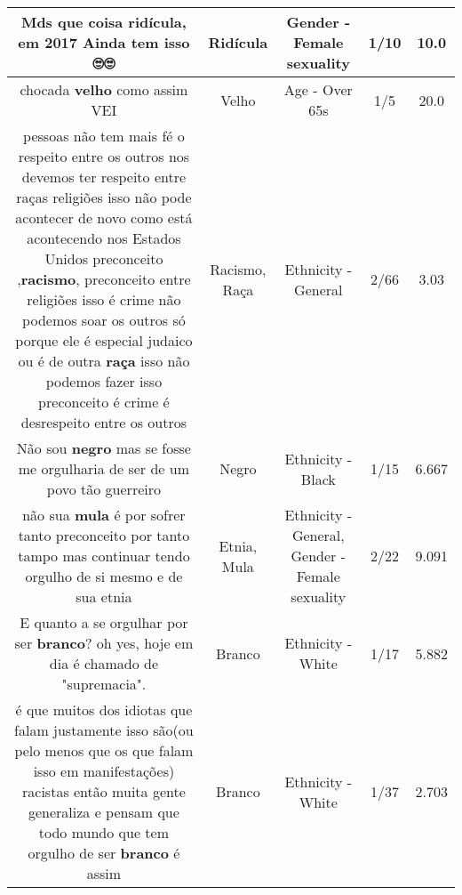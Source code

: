 \documentclass[11pt]{article}
\newlength\mylength
\begin{document}
\begin{center}
\begin{longtable}{|C{.65\mylength}|C{.30\mylength}|C{.12\mylength}|C{.12\mylength}|C{.12\mylength}|}
  \small Mds que coisa \textbf{ridícula}, em 2017 Ainda tem isso 🙄🙄\normalsize   & Ridícula & Gender - Female sexuality & 1/10 & 10.0 \\  \hline
  \small chocada \textbf{velho} como assim VEI\normalsize   & Velho & Age - Over 65s & 1/5 & 20.0 \\  \hline
  \small pessoas não  tem mais fé  o respeito entre os outros nos devemos ter respeito entre raças  religiões  isso não pode acontecer de novo como está  acontecendo nos Estados Unidos  preconceito  ,\textbf{racismo}, preconceito entre religiões  isso é crime não podemos soar os outros só porque ele é  especial  judaico ou é  de outra \textbf{raça} isso não podemos  fazer isso preconceito é crime é  desrespeito entre os outros\normalsize   & Racismo, Raça & Ethnicity - General & 2/66 & 3.03 \\  \hline
  \small Não sou \textbf{negro} mas se fosse me orgulharia de ser de um povo tão guerreiro\normalsize   & Negro & Ethnicity - Black & 1/15 & 6.667 \\  \hline
  \small não sua \textbf{mula} é por sofrer tanto preconceito por tanto tampo mas continuar tendo orgulho de si mesmo e de sua etnia\normalsize   & Etnia, Mula & Ethnicity - General, Gender - Female sexuality & 2/22 & 9.091 \\  \hline
  \small E quanto a se orgulhar por ser \textbf{branco}? oh yes, hoje em dia é chamado de "supremacia".\normalsize   & Branco & Ethnicity - White & 1/17 & 5.882 \\  \hline
  \small é que  muitos dos idiotas que falam justamente isso são(ou pelo menos que os que falam isso em manifestações) racistas então muita gente generaliza e pensam que todo mundo que tem orgulho de ser \textbf{branco} é assim\normalsize   & Branco & Ethnicity - White & 1/37 & 2.703 \\  \hline

\end{longtable}
\end{center}
\end{document}
